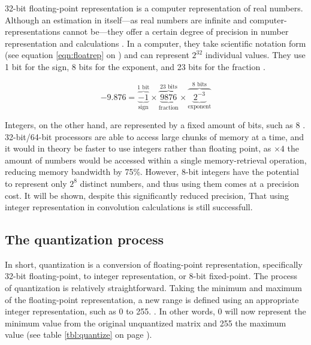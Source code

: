 32-bit floating-point representation is a computer representation of real numbers. Although an estimation in itself---as real numbers are infinite and computer-representations cannot be---they offer a certain degree of precision in number representation and calculations \cite{ieee}. In a computer, they take scientific notation form (see equation \ref{eqn:floatrep} on \pageref{eqn:floatrep}) and can represent $2^{32}$ individual values. They use 1 bit for the sign, 8 bits for the exponent, and 23 bits for the fraction \cite{ieee}.

\begin{equation}
\label{eqn:floatrep}
-9.876 = \overbrace{\underbrace{-1}_\text{sign}}^\text{1 bit}\times\overbrace{\underbrace{9876}_\text{fraction}}^\text{23 bits}\times\overbrace{\underbrace{2^{-3}}_\text{exponent}}^\text{8 bits}
\end{equation}

Integers, on the other hand, are represented by a fixed amount of bits, such as 8 \cite{ieee}. 32-bit/64-bit processors are able to access large chunks of memory at a time, and it would in theory be faster to use integers rather than floating point, as $\times4$ the amount of numbers would be accessed within a single memory-retrieval operation, reducing memory bandwidth by 75\%. However, 8-bit integers have the potential to represent only $2^{8}$ distinct numbers, and thus using them comes at a precision cost. It will be shown, despite this significantly reduced precision, That using integer representation in convolution calculations is still successfull.

\subsection{The quantization process}
In short, quantization is a conversion of floating-point representation, specifically 32-bit floating-point, to integer representation, or 8-bit fixed-point. The process of quantization is relatively straightforward. Taking the minimum and maximum of the floating-point representation, a new range is defined using an appropriate integer representation, such as 0 to 255. \cite{warden_quantize}. In other words, 0 will now represent the minimum value from the original unquantized matrix and 255 the maximum value (see table \ref{tbl:quantize} on page \pageref{tbl:quantize}).

